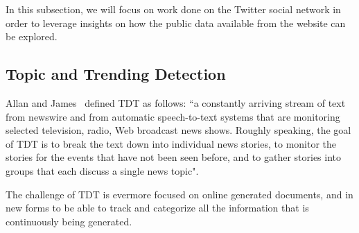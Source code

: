In this subsection, we will focus on work done on the Twitter social network in order to leverage insights on how the public data available from the website can be explored. 

\subsection{Topic and Trending Detection} 
\label{sub:real_time_topic_and_trending_detection}

Allan and James~\cite{allan2002topic} defined \ac{TDT} as follows: “a constantly arriving stream of text from newswire and from automatic speech-to-text systems that are monitoring selected television, radio, Web broadcast news shows. Roughly speaking, the goal of \ac{TDT} is to break the text down into individual news stories, to monitor the stories for the events that have not been seen before, and to gather stories into groups that each discuss a single news topic".


The challenge of \ac{TDT} is evermore focused on online generated documents, and in new forms to be able to track and categorize all the information that is continuously being generated.


